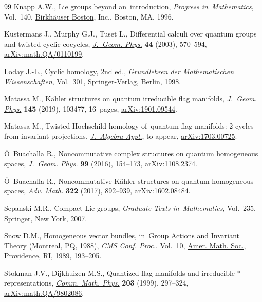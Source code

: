 \documentclass[10pt,a4paper]{amsart}
\numberwithin{equation}{section}
\begin{document}
\begin{thebibliography}{99}
Knapp A.W., Lie groups beyond an~introduction, \textit{Progress in~Mathematics}, Vol.~140, \href{https://doi.org/10.1007/978-1-4757-2453-0}{Birkh\"auser Boston}, Inc., Boston, MA, 1996.

Kustermans J., Murphy G.J., Tuset L., Differential calculi over quantum groups
 and twisted cyclic cocycles, \href{https://doi.org/10.1016/S0393-0440(02)00115-8}{\textit{J.~Geom. Phys.}} \textbf{44} (2003),
 570--594, \href{https://arxiv.org/abs/math.QA/0110199}{arXiv:math.QA/0110199}.

Loday J.-L., Cyclic homology, 2nd ed., \textit{Grundlehren der Mathematischen
 Wissenschaften}, Vol.~301, \href{https://doi.org/10.1007/978-3-662-11389-9}{Springer-Verlag}, Berlin, 1998.

Matassa M., K\"ahler structures on quantum irreducible flag manifolds,
 \href{https://doi.org/10.1016/j.geomphys.2019.07.008}{\textit{J.~Geom. Phys.}} \textbf{145} (2019), 103477, 16~pages,
 \href{https://arxiv.org/abs/1901.09544}{arXiv:1901.09544}.

Matassa M., Twisted Hoch\-schild homology of~quantum flag manifolds: 2-cycles
 from invariant projections, \href{http://dx.doi.org/10.1142/S0219498804000940}{\textit{J.~Algebra Appl.}}, {t}o appear,
 \href{https://arxiv.org/abs/1703.00725}{arXiv:1703.00725}.

\'O~Buachalla R., Noncommutative complex structures on quantum homogeneous
 spaces, \href{https://doi.org/10.1016/j.geomphys.2015.10.003}{\textit{J.~Geom. Phys.}} \textbf{99} (2016), 154--173,
 \href{https://arxiv.org/abs/1108.2374}{arXiv:1108.2374}.

\'O~Buachalla R., Noncommutative {K}\"ahler structures on quantum homogeneous
 spaces, \href{https://doi.org/10.1016/j.aim.2017.09.031}{\textit{Adv. Math.}} \textbf{322} (2017), 892--939,
 \href{https://arxiv.org/abs/1602.08484}{arXiv:1602.08484}.

Sepanski M.R., Compact {L}ie groups, \textit{Graduate Texts in~Mathematics},
 Vol.~235, \href{https://doi.org/10.1007/978-0-387-49158-5}{Springer}, New York, 2007.

Snow D.M., Homogeneous vector bundles, in~Group Actions and Invariant Theory
 ({M}ontreal, {PQ}, 1988), \textit{CMS Conf. Proc.}, Vol.~10, \href{https://doi.org/10.1007/bf02564684}{Amer. Math.
 Soc.}, Providence, RI, 1989, 193--205.

Stokman J.V., Dijkhuizen M.S., Quantized flag manifolds and irreducible
 {$*$}-representations, \href{https://doi.org/10.1007/s002200050613}{\textit{Comm. Math. Phys.}} \textbf{203} (1999),
 297--324, \href{https://arxiv.org/abs/math.QA/9802086}{arXiv:math.QA/9802086}.


\end{thebibliography}
\end{document}
